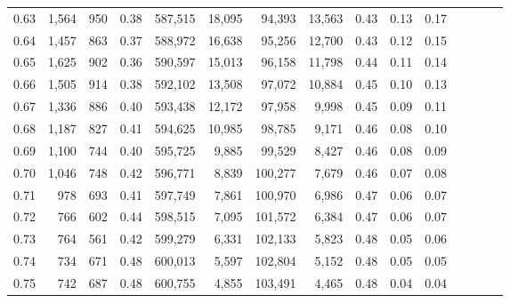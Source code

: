 \begin{tabular}{rrrcrrrrrrrrrrr}
0.63 &   1,564 &    950 &                                       0.38 &  587,515 &   18,095 &   94,393 &   13,563 &  0.43 &  0.13 &                         0.17 \\
0.64 &   1,457 &    863 &                                       0.37 &  588,972 &   16,638 &   95,256 &   12,700 &  0.43 &  0.12 &                         0.15 \\
0.65 &   1,625 &    902 &                                       0.36 &  590,597 &   15,013 &   96,158 &   11,798 &  0.44 &  0.11 &                         0.14 \\
0.66 &   1,505 &    914 &                                       0.38 &  592,102 &   13,508 &   97,072 &   10,884 &  0.45 &  0.10 &                         0.13 \\
0.67 &   1,336 &    886 &                                       0.40 &  593,438 &   12,172 &   97,958 &    9,998 &  0.45 &  0.09 &                         0.11 \\
0.68 &   1,187 &    827 &                                       0.41 &  594,625 &   10,985 &   98,785 &    9,171 &  0.46 &  0.08 &                         0.10 \\
0.69 &   1,100 &    744 &                                       0.40 &  595,725 &    9,885 &   99,529 &    8,427 &  0.46 &  0.08 &                         0.09 \\
0.70 &   1,046 &    748 &                                       0.42 &  596,771 &    8,839 &  100,277 &    7,679 &  0.46 &  0.07 &                         0.08 \\
0.71 &     978 &    693 &                                       0.41 &  597,749 &    7,861 &  100,970 &    6,986 &  0.47 &  0.06 &                         0.07 \\
0.72 &     766 &    602 &                                       0.44 &  598,515 &    7,095 &  101,572 &    6,384 &  0.47 &  0.06 &                         0.07 \\
0.73 &     764 &    561 &                                       0.42 &  599,279 &    6,331 &  102,133 &    5,823 &  0.48 &  0.05 &                         0.06 \\
0.74 &     734 &    671 &                                       0.48 &  600,013 &    5,597 &  102,804 &    5,152 &  0.48 &  0.05 &                         0.05 \\
0.75 &     742 &    687 &                                       0.48 &  600,755 &    4,855 &  103,491 &    4,465 &  0.48 &  0.04 &                         0.04 \\

\end{tabular}
